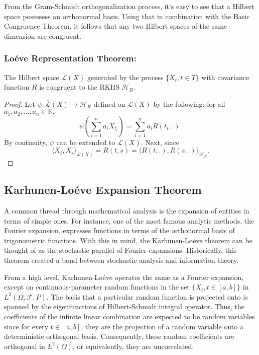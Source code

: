 \documentclass{article}
\theoremstyle{definition}
\theoremstyle{remark}
\numberwithin{equation}{section}
\begin{document}
From the Gram-Schmidt orthogonalization process, it's easy to see that a Hilbert space posessess an orthonormal basis. Using that in combination with the Basic Congruence Theorem, it follows that any two Hilbert spaces of the same dimension are congruent. 

\subsubsection{Lo\'{e}ve Representation Theorem:} The Hilbert space $\overline{\mathcal{L}} (X)$ generated by the process $\{ X_t, t \in T \}$ with covariance function $R$ is congruent to the RKHS $\mathcal{H}_R$. 

\begin{proof}
Let $\psi: \overline{\mathcal{L}} (X)\rightarrow \mathcal{H} _R$ defined on $\mathcal{L} (X)$ by the following: for all $a_1, a_2, \dots , a_n \in \mathbb{R},$
$$\psi \left( \sum ^n _{i = 1} a_i X_{t_i} \right) = \sum ^n _{i = 1} a_i R(t_i, .).$$
By continuity, $\psi$ can be extended to $\overline{\mathcal{L}} (X)$. Next, since 
$$\langle X_t, X_s \rangle _{\overline{\mathcal{L}} (X)} = R(t,s) = \langle R(t,.), R(s,.) \rangle _{\mathcal{H}_R}. $$
\end{proof}

\subsection{Karhunen-Lo\'{e}ve Expansion Theorem}
A common thread through mathematical analysis is the expansion of entities in terms of simple ones. For instance, one of the most famous analytic methods, the Fourier expansion, expresses functions in terms of the orthonormal basis of trigonometric functions. With this in mind, the Karhunen-Lo\'{e}ve theorem can be thought of as the stochastic parallel of Fourier expansions. Historically, this theorem created a bond between stochastic analysis and information theory. 

From a high level, Karhunen-Lo\'{e}ve operates the same as a Fourier expansion, except on continuous-parameter random functions in the set $\{ X_t , t \in [a, b] \}$ in $L^2 (\Omega, \mathcal{F}, P)$. The basis that a particular random function is projected onto is spanned by the eigenfunctions of Hilbert-Schmidt integral operator. Thus, the coefficients of the infinite linear combination are expected to be random variables since for every $t \in [a, b]$, they are the projection of a random variable onto a deterministic orthogonal basis. Consequently, these random coefficients are orthogonal in $L^2 (\Omega)$, or equivalently, they are uncorrelated. 
\end{document}

